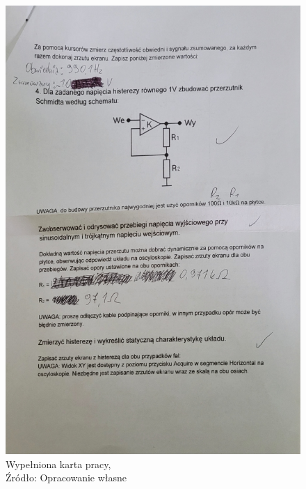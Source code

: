 \documentclass{article}
\begin{document}
    \begin{figure}[!ht]
      \begin{minipage}{.5\textwidth}
          \centering
          \includegraphics[scale=0.15]{grafiki/zdj3.jpg}
          \caption{Wypełniona karta pracy,
          \\Źródło: Opracowanie własne}
      \end{minipage}
      \begin{minipage}{.5\textwidth}
          \centering

\end{minipage}
\end{figure}
\end{document}
